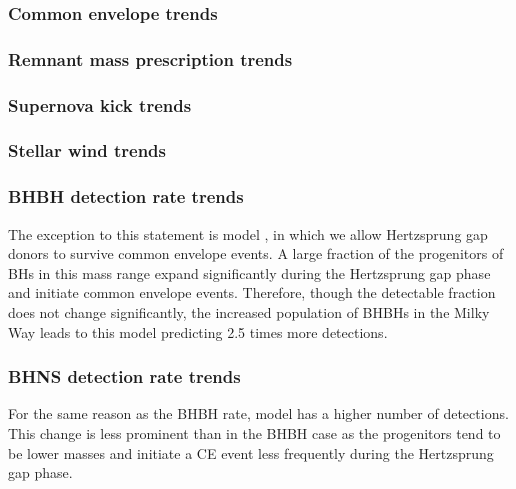 \subsubsection{Common envelope trends}\label{sec:detection_rate_CE_trends}

\subsubsection{Remnant mass prescription trends}

\subsubsection{Supernova kick trends}

\subsubsection{Stellar wind trends}

\subsubsection{BHBH detection rate trends}
The exception to this statement is model \modOpt{}, in which we allow Hertzsprung gap donors to survive common envelope events. A large fraction of the progenitors of BHs in this mass range expand significantly during the Hertzsprung gap phase and initiate common envelope events. Therefore, though the detectable fraction does not change significantly, the increased population of BHBHs in the Milky Way leads to this model predicting 2.5 times more detections.

\subsubsection{BHNS detection rate trends}

For the same reason as the BHBH rate, model \modOpt{} has a higher number of detections. This change is less prominent than in the BHBH case as the progenitors tend to be lower masses and initiate a CE event less frequently during the Hertzsprung gap phase. 


